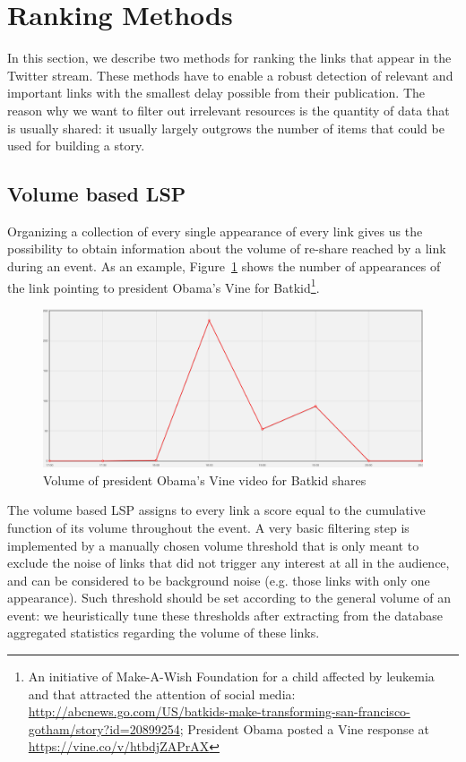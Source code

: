 \documentclass{sig-alternate}
\begin{document}

\section{Ranking Methods}
\label{sec:ranking_methods}
In this section, we describe two methods for ranking the links that appear in the Twitter stream. These methods have to enable a robust detection of relevant and important links with the smallest delay possible from their publication. The reason why we want to filter out irrelevant resources is the quantity of data that is usually shared: it usually largely outgrows the number of items that could be used for building a story.

\subsection{Volume based LSP}
\label{sec:volume_based_links_selection}
Organizing a collection of every single appearance of every link gives us the possibility to obtain information about the volume of re-share reached by a link during an event. As an example, Figure~\ref{fig:batkid_whitehouse_volume} shows the number of appearances of the link pointing to president Obama's Vine for Batkid\footnote{An initiative of Make-A-Wish Foundation for a child affected by leukemia and that attracted the attention of social media: \url{http://abcnews.go.com/US/batkids-make-transforming-san-francisco-gotham/story?id=20899254}; President Obama posted a Vine response at \url{https://vine.co/v/htbdjZAPrAX}}.
\begin{figure}[htbp]
  \centering
  \includegraphics[width=\linewidth]{Figures/batkid_whitehouse_volume.png}
  \caption{Volume of president Obama's Vine video for Batkid shares}
  \label{fig:batkid_whitehouse_volume}
\end{figure}

The volume based LSP assigns to every link a score equal to the cumulative function of its volume throughout the event. A very basic filtering step is implemented by a manually chosen volume threshold that is only meant to exclude the noise of links that did not trigger any interest at all in the audience, and can be considered to be background noise (e.g. those links with only one appearance). Such threshold should be set according to the general volume of an event: we heuristically tune these thresholds after extracting from the database aggregated statistics regarding the volume of these links.
\end{document}
